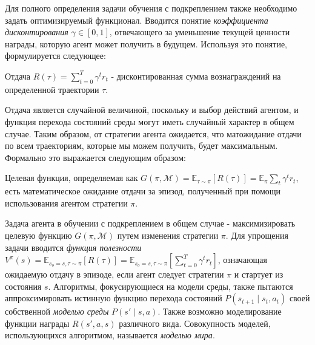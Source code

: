 Для полного определения задачи обучения с подкреплением также необходимо задать оптимизируемый функционал.
Вводится понятие \textit{коэффициента дисконтирования} $\gamma \in \left[0,1\right]$, отвечающего за уменьшение текущей ценности награды, которую агент может получить в будущем. Используя это понятие, формулируется следующее:
 \begin{Def}
    Отдача $R(\tau) = \sum_{t=0}^{T}\gamma^t r_t$ - дисконтированная сумма вознаграждений на определенной траектории $\tau$.
 \end{Def}
Отдача является случайной величиной, поскольку и выбор действий агентом, и функция перехода состояний среды могут иметь случайный характер в общем случае. 
Таким образом, от стратегии агента ожидается, что матожидание отдачи по всем траекториям, которые мы можем получить, будет максимальным. 
Формально это выражается следующим образом:
\begin{Def}
    Целевая функция, определяемая как $G(\pi, \mathcal{M}) = \mathbb{E}_{\tau \sim \pi}\left[R\left(\tau\right)\right] = \mathbb{E}_{\pi}\sum_{t}\gamma^t r_t$, есть математическое ожидание отдачи за эпизод, полученный при помощи использования агентом стратегии $\pi$. 
\end{Def}
Задача агента в обучении с подкреплением в общем случае - максимизировать целевую функцию $G(\pi, \mathcal{M})$ путем изменения стратегии $\pi$.
Для упрощения задачи вводится \textit{функция полезности} $V^{\pi}(s) = \mathbb{E}_{s_o=s,\tau \sim \pi}\left[R(\tau)\right] = \mathbb{E}_{s_o=s,\tau \sim \pi}\left[\sum_{t=0}^{T}\gamma^t r_t\right]$, означающая ожидаемую отдачу в эпизоде, если агент следует стратегии $\pi$ и стартует из состояния $s$. Алгоритмы, фокусирующиеся на модели среды, также пытаются аппроксимировать истинную функцию перехода состояний $P(s_{t+1} \mid s_t, a_t)$ своей собственной \textit{моделью среды} $\mathit{P}(s' \mid s, a)$. Также возможно моделирование функции награды $\mathit{R}(s', a, s)$ различного вида.
Совокупность моделей, использующихся алгоритмом, называется \textit{моделью мира}.

